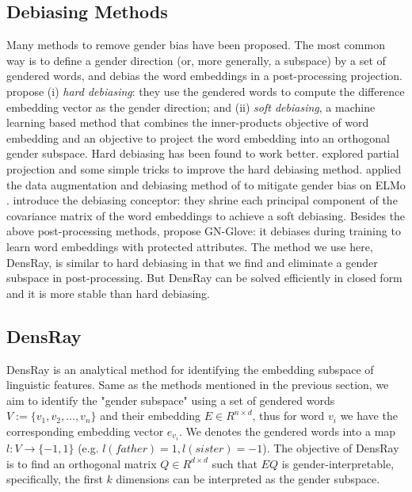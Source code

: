 

\subsection{Debiasing Methods}
 Many methods to remove gender bias have been proposed. The
 most common way is to define a gender direction (or, more
 generally, a subspace) by a set of gendered words, and
 debias the word embeddings in a post-processing
 projection. \citet{bolukbasi2016man} propose (i) \emph{hard
   debiasing}: they use the gendered words to compute the
 difference embedding vector as the gender direction; and
 (ii) \emph{soft debiasing},
 a
 machine learning based method
that combines
 the inner-products objective of word embedding and an
 objective to project the word embedding into an orthogonal
 gender subspace. Hard debiasing has been found to work
 better. 
 \citet{dev2019attenuating} explored partial projection and
 some simple tricks to improve the hard debiasing
 method. \citet{zhao2019gender} applied the data
 augmentation and debiasing method of
 \citet{bolukbasi2016man} to mitigate gender bias on ELMo
 \citep{Peters:2018}. \citet{karve2019conceptor} introduce
 the debiasing conceptor: they shrine each
 principal component of the covariance matrix of the word
 embeddings to achieve a soft debiasing. Besides the above
 post-processing methods, \citep{zhao2018learning} propose
 GN-Glove: it debiases during training to learn word
 embeddings with protected attributes. The method we use
 here, DensRay, is similar to
hard debiasing in that we find
and eliminate a gender subspace in post-processing.
But DensRay can be solved efficiently in closed form and it
is more stable than hard debiasing.

 
\subsection{DensRay}
DensRay is an analytical method for identifying the embedding subspace of linguistic features. Same as the methods mentioned in the previous section, we aim to identify the "gender subspace" using a set of gendered words $V:=\{v_1,v_2,\dots,v_n\}$ and their embedding $E \in R^{n\times d}$, thus for word $v_i$ we have the corresponding embedding vector $e_{v_i}$. We denotes the gendered words into a map $l:V\to \{-1,1\}$ (e.g. $l(father)=1,l(sister)=-1$). The objective of DensRay is to find an orthogonal matrix $Q\in R^{d\times d}$ such that $EQ$ is gender-interpretable, specifically, the first $k$ dimensions can be interpreted as the gender subspace.

